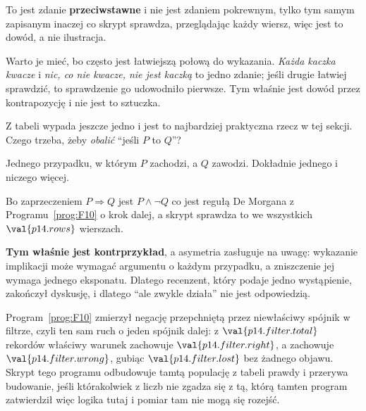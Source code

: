 \begin{fr}
To jest zdanie \textbf{przeciwstawne} i nie jest zdaniem pokrewnym, tylko tym
samym zapisanym inaczej \dash{} co skrypt sprawdza, przeglądając każdy wiersz,
więc jest to dowód, a nie ilustracja.

Warto je mieć, bo często jest łatwiejszą połową do wykazania. \emph{Każda
kaczka kwacze} i \emph{nic, co nie kwacze, nie jest kaczką} to jedno zdanie;
jeśli drugie łatwiej sprawdzić, to sprawdzenie go udowodniło pierwsze. Tym
właśnie jest dowód przez kontrapozycję i nie jest to sztuczka.

\end{fr}

\begin{fr}
Z tabeli wypada jeszcze jedno i jest to najbardziej praktyczna rzecz w tej
sekcji. Czego trzeba, żeby \emph{obalić} \enquote{jeśli $P$ to $Q$}?
\nextframe
\end{fr}

\begin{fr}
\begin{ansblock}
Jednego przypadku, w którym $P$ zachodzi, a $Q$ zawodzi. Dokładnie jednego i
niczego więcej.
\end{ansblock}

Bo zaprzeczeniem $P \Rightarrow Q$ jest $P \wedge \lnot Q$ \dash{} co jest
regułą De Morgana z Programu~\ref{prog:F10} o krok dalej, a skrypt sprawdza to
we wszystkich $\val{p14.rows}$ wierszach.

\textbf{Tym właśnie jest kontrprzykład}, a asymetria zasługuje na uwagę:
wykazanie implikacji może wymagać argumentu o każdym przypadku, a zniszczenie
jej wymaga jednego eksponatu. Dlatego recenzent, który podaje jedno
wystąpienie, zakończył dyskusję, i dlatego \enquote{ale zwykle działa} nie
jest odpowiedzią.

\begin{note}
Program~\ref{prog:F10} zmierzył negację przepchniętą przez niewłaściwy
spójnik w filtrze, czyli ten sam ruch o jeden spójnik dalej: z
$\val{p14.filter.total}$ rekordów właściwy warunek zachowuje
$\val{p14.filter.right}$, a  zachowuje
$\val{p14.filter.wrong}$, gubiąc $\val{p14.filter.lost}$ bez żadnego objawu.
Skrypt tego programu odbudowuje tamtą populację z tabeli prawdy i przerywa
budowanie, jeśli którakolwiek z liczb nie zgadza się z tą, którą tamten
program zatwierdził \dash{} więc logika tutaj i pomiar tam nie mogą się
rozejść.
\end{note}
\end{fr}

